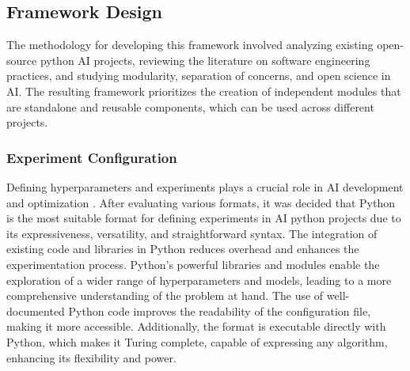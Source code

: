 \subsection{Framework Design}
The methodology for developing this framework involved analyzing existing open-source python AI projects, reviewing the literature on software engineering practices, and studying modularity, separation of concerns, and open science in AI. The resulting framework prioritizes the creation of independent modules that are standalone and reusable components, which can be used across different projects.

\subsubsection{Experiment Configuration}

Defining hyperparameters and experiments plays a crucial role in AI development and optimization \cite{wu2019hyperparameter}. After evaluating various formats, it was decided that Python is the most suitable format for defining experiments in AI python projects due to its expressiveness, versatility, and straightforward syntax. The integration of existing code and libraries in Python reduces overhead and enhances the experimentation process. Python's powerful libraries and modules enable the exploration of a wider range of hyperparameters and models, leading to a more comprehensive understanding of the problem at hand. The use of well-documented Python code improves the readability of the configuration file, making it more accessible. Additionally, the format is executable directly with Python, which makes it Turing complete, capable of expressing any algorithm, enhancing its flexibility and power.







